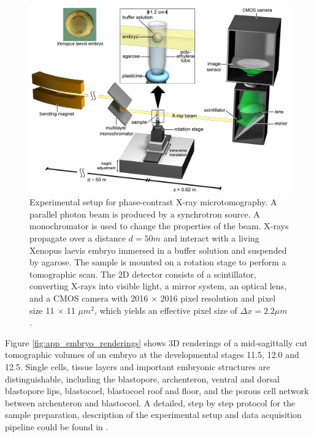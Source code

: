 \begin{figure}[ht]
  \centerline{
    \includegraphics[scale = 0.25]{figures/app_embryo_setup.PNG} 
  }  
  \caption{Experimental setup for phase-contrast X-ray microtomography. A parallel photon beam is produced by a synchrotron source. A monochromator is used to change the properties of the beam. X-rays propagate over a distance $d=50 m$ and interact with a living Xenopus laevis embryo immersed in a buffer solution and suspended by agarose. The sample is mounted on a rotation stage to perform a tomographic scan. The 2D detector consists of a scintillator, converting X-rays into visible light, a mirror system, an optical lens, and a 
CMOS camera with 2016 $\times$ 2016 pixel resolution and pixel size 11 $\times$ 11 $\mu m^2$,  which yields an effective pixel size of $\Delta x = 2.2 \mu m$.}
  \label{fig:app_embryo_setup}
\end{figure}

Figure \ref{fig:app_embryo_renderings} shows 3D renderings of a mid-sagittally cut tomographic volumes of an embryo at the developmental stages 11.5, 12.0 and 12.5.
Single cells, tissue layers and important embryonic structures are distinguishable, including the
blastopore, archenteron, ventral and dorsal blastopore lips, blastocoel, blastocoel roof and floor, and the porous cell network between archenteron and blastocoel. A detailed, step by step protocol for the sample preparation, description of the experimental setup and data acquisition pipeline could be found in \cite{Moosmann14}. 

